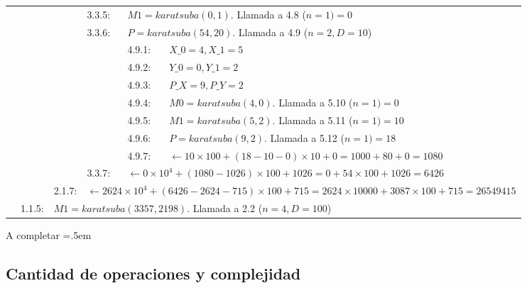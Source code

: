 \documentclass[titlepage,a4paper]{article}
\newenvironment{lcverbatim}
 {\SaveVerbatim{cverb}}
 {\endSaveVerbatim
  \flushleft\fboxrule=0pt\fboxsep=.5em
  \colorbox{cverbbg}{%
    \makebox[\dimexpr\linewidth-2\fboxsep][l]{\BUseVerbatim{cverb}}%
  }
  \endflushleft
}
\begin{document}
\begin{longtable}[r]{lllllll}
\multicolumn{3}{l}{}     & 3.3.5:     & \multicolumn{3}{l}{$M1=karatsuba(0,1)$. Llamada a 4.8 ($n=1) = \boxed{0}$}     \\
\multicolumn{3}{l}{}     & 3.3.6:     & \multicolumn{3}{l}{$P=karatsuba(54,20)$. Llamada a 4.9 ($n=2,D=10$)}     \\
\multicolumn{4}{l}{}     & 4.9.1:     & \multicolumn{2}{l}{$X\_0=4, X\_1=5$}     \\
\multicolumn{4}{l}{}     & 4.9.2:     & \multicolumn{2}{l}{$Y\_0=0, Y\_1=2$}     \\
\multicolumn{4}{l}{}     & 4.9.3:     & \multicolumn{2}{l}{$P\_X=9, P\_Y=2$}     \\
\multicolumn{4}{l}{}     & 4.9.4:     & \multicolumn{2}{l}{$M0=karatsuba(4,0)$. Llamada a 5.10 ($n=1) = \boxed{0}$}     \\
\multicolumn{4}{l}{}     & 4.9.5:     & \multicolumn{2}{l}{$M1=karatsuba(5,2)$. Llamada a 5.11 ($n=1) = \boxed{10}$}     \\
\multicolumn{4}{l}{}     & 4.9.6:     & \multicolumn{2}{l}{$P=karatsuba(9,2)$. Llamada a 5.12 ($n=1) = \boxed{18}$}     \\
\multicolumn{4}{l}{}     & 4.9.7:     & \multicolumn{2}{l}{$\leftarrow 10\times 100 + (18-10-0)\times 10 + 0 =  1000 + 80 + 0 = \boxed{1080}$}     \\
\multicolumn{3}{l}{}     & 3.3.7:     & \multicolumn{3}{l}{$\leftarrow 0\times 10^4 + (1080-1026)\times 100 + 1026 =  0 + 54\times 100 + 1026 = \boxed{6426}$}     \\
\multicolumn{2}{l}{}     & 2.1.7:     & \multicolumn{4}{l}{$\leftarrow 2624\times 10^4 + (6426-2624-715)\times 100 + 715 =  2624\times 10000 + 3087\times 100 + 715 = \boxed{26549415}$}     \\
     & 1.1.5:     & \multicolumn{5}{l}{$M1=karatsuba(3357,2198)$. Llamada a 2.2 ($n=4,D=100$)}     \\

\end{longtable}

\begin{lcverbatim}
    A completar
\end{lcverbatim}

\subsection{Cantidad de operaciones y complejidad}
\end{document}
